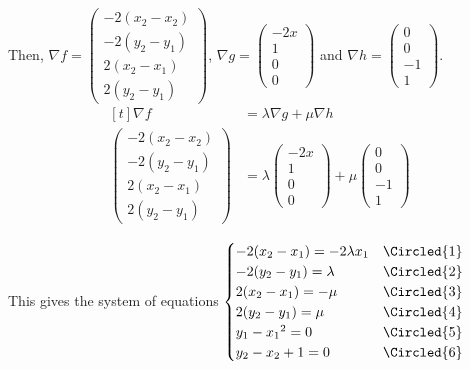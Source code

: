 \documentclass[11pt,fleqn]{book} %
\begin{document}
Then, $\nabla f = \begin{pmatrix} -2(x_2 - x_2) \\ -2(y_2 - y_1) \\ 2(x_2 - x_1) \\ 2(y_2 - y_1) \end{pmatrix}$, $\nabla g = \begin{pmatrix} -2x \\ 1 \\ 0 \\ 0 \end{pmatrix}$ and $\nabla h = \begin{pmatrix} 0 \\ 0 \\ -1 \\ 1 \end{pmatrix}$. 
$$\begin{aligned}[t]
    \nabla f 
     & = \lambda \nabla g + \mu \nabla h \\
    \begin{pmatrix} -2(x_2 - x_2) \\ -2(y_2 - y_1) \\ 2(x_2 - x_1) \\ 2(y_2 - y_1) \end{pmatrix} 
     & = \lambda \begin{pmatrix} -2x \\ 1 \\ 0 \\ 0 \end{pmatrix} + \mu \begin{pmatrix} 0 \\ 0 \\ -1 \\ 1 \end{pmatrix}
\end{aligned}$$

This gives the system of equations $\begin{cases}
    -2(x_2 - x_1) = -2\lambda x_1 & \Circled{1} \\
    -2(y_2 - y_1) = \lambda       & \Circled{2} \\
    2(x_2 - x_1) = -\mu           & \Circled{3} \\
    2(y_2 - y_1) = \mu            & \Circled{4} \\
    y_1 - {x_1}^2 = 0             & \Circled{5} \\
    y_2 - x_2 + 1 = 0             & \Circled{6}
\end{cases}$
\end{document}

